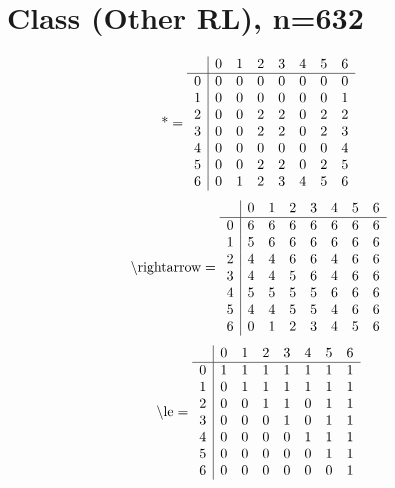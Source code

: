 \documentclass[11pt]{article}
\begin{document}
\section{Class (Other RL), n=632}
\[\text{*} = 
\begin{array}{r | r r r r r r r}
 & 0 & 1 & 2 & 3 & 4 & 5 & 6 \\ \hline
0 & 0 & 0 & 0 & 0 & 0 & 0 & 0 \\
1 & 0 & 0 & 0 & 0 & 0 & 0 & 1 \\
2 & 0 & 0 & 2 & 2 & 0 & 2 & 2 \\
3 & 0 & 0 & 2 & 2 & 0 & 2 & 3 \\
4 & 0 & 0 & 0 & 0 & 0 & 0 & 4 \\
5 & 0 & 0 & 2 & 2 & 0 & 2 & 5 \\
6 & 0 & 1 & 2 & 3 & 4 & 5 & 6 \\
\end{array}
\]
\[\text{\textbackslash rightarrow} = 
\begin{array}{r | r r r r r r r}
 & 0 & 1 & 2 & 3 & 4 & 5 & 6 \\ \hline
0 & 6 & 6 & 6 & 6 & 6 & 6 & 6 \\
1 & 5 & 6 & 6 & 6 & 6 & 6 & 6 \\
2 & 4 & 4 & 6 & 6 & 4 & 6 & 6 \\
3 & 4 & 4 & 5 & 6 & 4 & 6 & 6 \\
4 & 5 & 5 & 5 & 5 & 6 & 6 & 6 \\
5 & 4 & 4 & 5 & 5 & 4 & 6 & 6 \\
6 & 0 & 1 & 2 & 3 & 4 & 5 & 6 \\
\end{array}
\]
\[\text{\textbackslash le} = 
\begin{array}{r | r r r r r r r}
 & 0 & 1 & 2 & 3 & 4 & 5 & 6 \\ \hline
0 & 1 & 1 & 1 & 1 & 1 & 1 & 1 \\
1 & 0 & 1 & 1 & 1 & 1 & 1 & 1 \\
2 & 0 & 0 & 1 & 1 & 0 & 1 & 1 \\
3 & 0 & 0 & 0 & 1 & 0 & 1 & 1 \\
4 & 0 & 0 & 0 & 0 & 1 & 1 & 1 \\
5 & 0 & 0 & 0 & 0 & 0 & 1 & 1 \\
6 & 0 & 0 & 0 & 0 & 0 & 0 & 1 \\
\end{array}
\]
\end{document}
